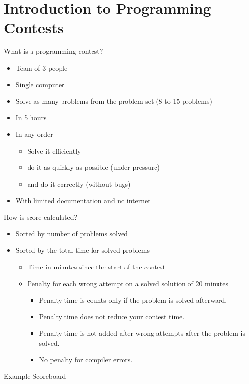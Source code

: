 \documentclass[11pt,pdf, aspectratio=169]{beamer}
\begin{document}
  \section{Introduction to Programming Contests}
  \begin{frame}{What is a programming contest?}
    \begin{itemize}
      \item<1-> Team of 3 people
      \item<1-> Single computer
      \item<1-> Solve as many problems from the problem set (8 to 15 problems)
      \item<1-> In 5 hours
      \item<1-> In any order
      \begin{itemize}
        \item<2-> Solve it efficiently
        \item<2-> do it as quickly as possible (under pressure)
        \item<2-> and do it correctly (without bugs)
      \end{itemize}
      \item<3-> With limited documentation and no internet
    \end{itemize}
  \end{frame}
  \begin{frame}{How is score calculated?}
    \begin{itemize}
      \item<1-> Sorted by number of problems solved
      \item<2-> Sorted by the total time for solved problems
      \begin{itemize}
        \item<3->  Time in minutes since the start of the contest
        \item<3-> Penalty for each wrong attempt on a solved solution of 20 minutes
        \begin{itemize}
          \item<4-> Penalty time is counts only if the problem is solved afterward.
          \item<4-> Penalty time does not reduce your contest time.
          \item<4-> Penalty time is not added after wrong attempts after the problem is solved.
          \item<4-> No penalty for compiler errors.
        \end{itemize}
      \end{itemize}
    \end{itemize}
  \end{frame}
  {
    \begin{frame}{Example Scoreboard}
    \end{frame}
  }
\end{document}
